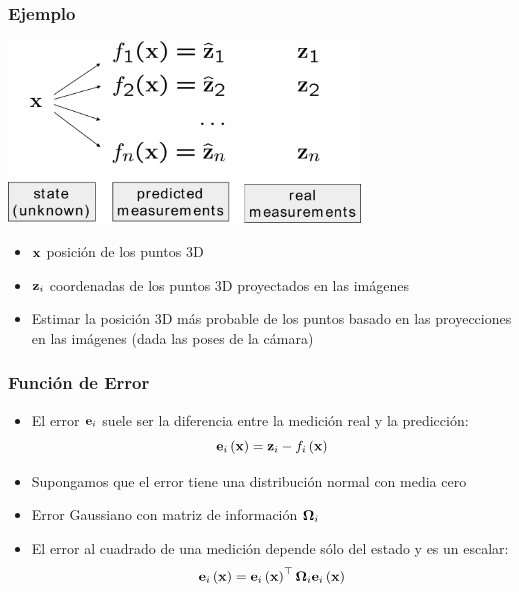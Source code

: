 \begin{frame}
    \frametitle{Ejemplo}
    
    \begin{center}
        \includegraphics[width=0.7\textwidth]{images/least_squares.pdf}
    \end{center}
    
    \begin{itemize}
        \item $\boldsymbol{\mathbf{x}}$ posición de los puntos 3D
        \item $\boldsymbol{\mathbf{z}}_{i}$ coordenadas de los puntos 3D proyectados en las imágenes
        \item Estimar la posición 3D más probable de los puntos basado en las proyecciones en las imágenes (dada las poses de la cámara)
    \end{itemize}
\end{frame}

\begin{frame}
    \frametitle{Función de Error}
    
    \begin{itemize}
        \item El error $\boldsymbol{\mathbf{e}}_{i}$ suele ser la diferencia entre la medición real y la predicción:
            \begin{equation*}
                \boldsymbol{\mathbf{e}}_{i}\left( \boldsymbol{\mathbf{x}} \right) = \boldsymbol{\mathbf{z}}_{i} - f_{i}\left( \boldsymbol{\mathbf{x}} \right)
            \end{equation*}
        \item Supongamos que el error tiene una distribución normal con media cero
        \item Error Gaussiano con matriz de información $\boldsymbol{\mathbf{\Omega}}_{i}$
        \item El error al cuadrado de una medición depende sólo del estado y es un escalar:
            \begin{equation*}
                \boldsymbol{\mathbf{e}}_{i}\left( \boldsymbol{\mathbf{x}} \right) = \boldsymbol{\mathbf{e}}_{i}\left( \boldsymbol{\mathbf{x}} \right)^{\top} \boldsymbol{\mathbf{\Omega}}_{i} \boldsymbol{\mathbf{e}}_{i}\left( \boldsymbol{\mathbf{x}} \right)
            \end{equation*}
    \end{itemize}
\end{frame}

